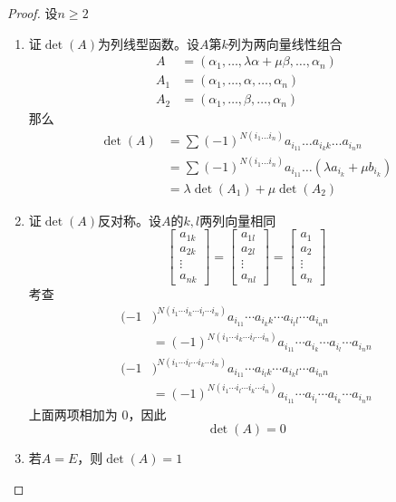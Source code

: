 \documentclass[11pt]{article}
\begin{document}
\begin{proof}
设\(n\ge2\)
\begin{enumerate}
\item 证\(\det(A)\)为列线型函数。设\(A\)第\(k\)列为两向量线性组合
\begin{align*}
A&=(\alpha_1,\dots,\lambda\alpha+\mu\beta,\dots,\alpha_n)\\
A_1&=(\alpha_1,\dots,\alpha,\dots,\alpha_n)\\
A_2&=(\alpha_1,\dots,\beta,\dots,\alpha_n)
\end{align*}
那么
\begin{align*}
\det(A)&=\sum(-1)^{N(i_1\dots i_n)}a_{i_11}\dots a_{i_kk}\dots a_{i_nn}\\
&=\sum(-1)^{N(i_1\dots i_n)}a_{i_11}\dots(\lambda a_{i_k}+\mu b_{i_k})\\
&=\lambda\det(A_1)+\mu\det(A_2)
\end{align*}
\item 证\(\det(A)\)反对称。设\(A\)的\(k,l\)两列向量相同
\begin{equation*}
\begin{bmatrix}
a_{1k}\\a_{2k}\\\vdots\\a_{nk}
\end{bmatrix}=
\begin{bmatrix}
a_{1l}\\a_{2l}\\\vdots\\a_{nl}
\end{bmatrix}=
\begin{bmatrix}
a_1\\a_2\\\vdots\\a_n
\end{bmatrix}
\end{equation*}
考查
\begin{align*}
(-1&)^{N(i_1\cdots i_k\cdots i_l\cdots i_n)}a_{i_11}\cdots a_{i_kk}\cdots a_{i_ll}\cdots
a_{i_nn}\\
&=(-1)^{N(i_1\cdots i_k\cdots i_l\cdots i_n)}a_{i_11}\cdots a_{i_k}\cdots a_{i_l}\cdots
a_{i_nn}\\
(-1&)^{N(i_1\cdots i_l\cdots i_k\cdots i_n)}a_{i_11}\cdots a_{i_lk}\cdots a_{i_kl}\cdots a_{i_nn}\\
&=(-1)^{N(i_1\cdots i_l\cdots i_k\cdots i_n)}a_{i_11}\cdots a_{i_l}
\cdots a_{i_k}\cdots a_{i_nn}
\end{align*}
上面两项相加为 0，因此
\begin{equation*}
\det(A)=0
\end{equation*}
\item 若\(A=E\)，则\(\det(A)=1\)
\end{enumerate}
\end{proof}
\end{document}
